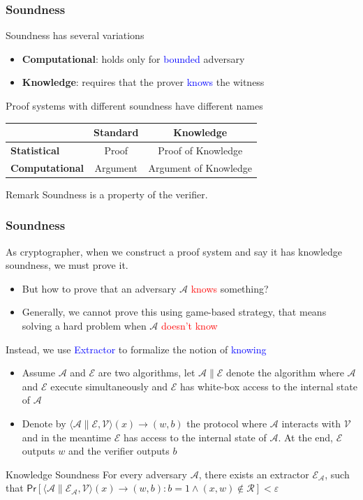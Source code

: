 \documentclass[handout]{beamer} %
\newcommand{\blue}[1]{\textcolor{blue}{#1}}
\newcommand{\dgreen}[1]{\textcolor{dgreen}{#1}}
\newcommand{\red}[1]{\textcolor{red}{#1}}
\begin{document}
\frame
{
  \frametitle{Soundness}
  \onslide<+-> Soundness has several variations
  \begin{itemize}
    \item<+-> \textbf{Computational}: holds only for \blue{bounded} adversary
    \item<+-> \textbf{Knowledge}: requires that the prover \blue{knows} the witness
  \end{itemize}
  \onslide<+->Proof systems with different soundness have different names
  \onslide<+->\begin{table}[tb]
    \centering

    \begin{tabular}{l|cc}
    \hline

    \hline
     & \textbf{Standard} & \textbf{Knowledge} \\
    \hline
      \textbf{Statistical}   & Proof & Proof of Knowledge \\
      \textbf{Computational} & Argument & Argument of Knowledge \\
    \hline

    \hline
    \end{tabular}
  \end{table}

  \onslide<+->\begin{block}{Remark}
  Soundness is a property of the verifier.
  \end{block}
}

\frame
{
  \frametitle{Soundness}
  \onslide<+->As cryptographer, when we construct a proof system and say it has knowledge soundness, we must prove it.
  \begin{itemize}
    \item<+->But how to prove that an adversary $\mathcal{A}$ \red{knows} something?
    \item<+->Generally, we cannot prove this using game-based strategy, that means solving a hard problem when $\mathcal{A}$ \red{doesn't know}
  \end{itemize}
  \onslide<+->Instead, we use \blue{Extractor} to formalize the notion of \blue{knowing}
  \begin{itemize}
    \item<+-> Assume $\mathcal{A}$ and $\mathcal{E}$ are two algorithms, let $\mathcal{A}\|\mathcal{E}$ denote the algorithm where $\mathcal{A}$ and $\mathcal{E}$ execute simultaneously and $\mathcal{E}$ has \dgreen{white-box} access to the internal state of $\mathcal{A}$
    \item<+-> Denote by $\langle\mathcal{A}\|\mathcal{E},\mathcal{V}\rangle(x)\to(w,b)$ the protocol where $\mathcal{A}$ interacts with $\mathcal{V}$ and in the meantime $\mathcal{E}$ has access to the internal state of $\mathcal{A}$. At the end, $\mathcal{E}$ outputs $w$ and the verifier outputs $b$
  \end{itemize}
  \onslide<+->\begin{block}{Knowledge Soundness}
  For every adversary $\mathcal{A}$, there exists an extractor $\mathcal{E}_{\mathcal{A}}$, such that $\mathsf{Pr}[\langle\mathcal{A}\|\mathcal{E}_{\mathcal{A}},\mathcal{V}\rangle(x)\to(w,b):b=1\wedge (x,w)\notin\mathcal{R}]<\varepsilon$
  \end{block}
}
\end{document}
